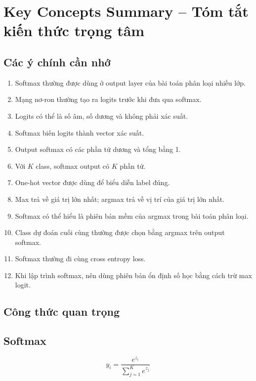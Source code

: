 \section{Key Concepts Summary -- Tóm tắt kiến thức trọng tâm}

\subsection{Các ý chính cần nhớ}

\begin{enumerate}
    \item Softmax thường được dùng ở output layer của bài toán phân loại nhiều lớp.
    \item Mạng nơ-ron thường tạo ra logits trước khi đưa qua softmax.
    \item Logits có thể là số âm, số dương và không phải xác suất.
    \item Softmax biến logits thành vector xác suất.
    \item Output softmax có các phần tử dương và tổng bằng 1.
    \item Với $K$ class, softmax output có $K$ phần tử.
    \item One-hot vector được dùng để biểu diễn label đúng.
    \item Max trả về giá trị lớn nhất; argmax trả về vị trí của giá trị lớn nhất.
    \item Softmax có thể hiểu là phiên bản mềm của argmax trong bài toán phân loại.
    \item Class dự đoán cuối cùng thường được chọn bằng argmax trên output softmax.
    \item Softmax thường đi cùng cross entropy loss.
    \item Khi lập trình softmax, nên dùng phiên bản ổn định số học bằng cách trừ max logit.
\end{enumerate}

\subsection{Công thức quan trọng}

\subsection*{Softmax}

\[
    y_i =
    \frac{e^{z_i}}
    {\sum_{j=1}^{K}e^{z_j}}
\]

